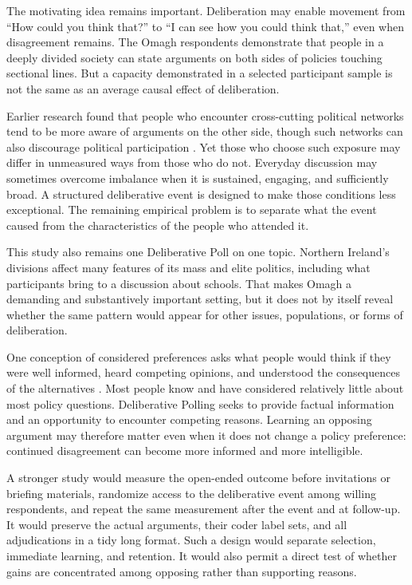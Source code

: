 \documentclass[11pt]{article}
\begin{document}
The motivating idea remains important. Deliberation may enable movement from ``How could you
think that?'' to ``I can see how you could think that,'' even when disagreement remains. The
Omagh respondents demonstrate that people in a deeply divided society can state arguments on
both sides of policies touching sectional lines. But a capacity demonstrated in a selected
participant sample is not the same as an average causal effect of deliberation.

Earlier research found that people who encounter cross-cutting political networks tend to be
more aware of arguments on the other side, though such networks can also discourage political
participation \citep{mutz2002cross,mutz2002consequences}. Yet those who choose such
exposure may differ in unmeasured ways from those who do not. Everyday discussion may
sometimes overcome imbalance when it is sustained, engaging, and sufficiently broad. A
structured deliberative event is designed to make those conditions less exceptional. The
remaining empirical problem is to separate what the event caused from the characteristics of
the people who attended it.

This study also remains one Deliberative Poll on one topic. Northern Ireland's divisions affect
many features of its mass and elite politics, including what participants bring to a discussion
about schools. That makes Omagh a demanding and substantively important setting, but it does
not by itself reveal whether the same pattern would appear for other issues, populations, or
forms of deliberation.

One conception of considered preferences asks what people would think if they were well
informed, heard competing opinions, and understood the consequences of the alternatives
\citep{fishkin1991democracy,fishkin2009people,dahl1989democracy,arendt1968truth}. Most
people know and have considered relatively little about most policy questions. Deliberative
Polling seeks to provide factual information and an opportunity to encounter competing
reasons. Learning an opposing argument may therefore matter even when it does not change a
policy preference: continued disagreement can become more informed and more intelligible.

A stronger study would measure the open-ended outcome before invitations or briefing
materials, randomize access to the deliberative event among willing respondents, and repeat the
same measurement after the event and at follow-up. It would preserve the actual arguments,
their coder label sets, and all adjudications in a tidy long format. Such a design would
separate selection, immediate learning, and retention. It would also permit a direct test of
whether gains are concentrated among opposing rather than supporting reasons.
\end{document}
